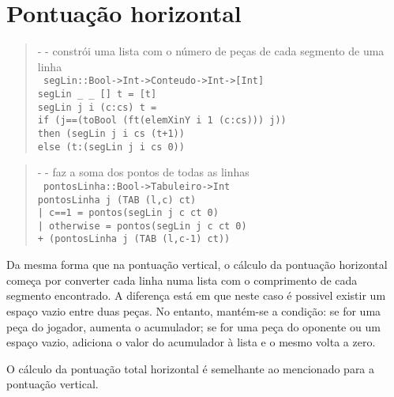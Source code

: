 \documentclass[a4paper,titlepage]{scrreprt}
\begin{document}
	\section{Pontuação horizontal}
		\begin{quote}
			{\small - - constrói uma lista com o número de peças de cada segmento de uma linha\\}
			{\tt
			segLin::Bool->Int->Conteudo->Int->[Int]\\
			segLin \_ \_ [] t = [t]\\
			segLin j i (c:cs) t =\\
			if (j==(toBool (ft(elemXinY i 1 (c:cs))) j))\\
			then (segLin j i cs (t+1))\\
			else (t:(segLin j i cs 0))
			}
		\end{quote}
		\begin{quote}
			{\small - - faz a soma dos pontos de todas as linhas\\}
			{\tt
			pontosLinha::Bool->Tabuleiro->Int\\
			pontosLinha j (TAB (l,c) ct)\\
			| c==1 = pontos(segLin j c ct 0)\\
            | otherwise = pontos(segLin j c ct 0)\\
			+ (pontosLinha j (TAB (l,c-1) ct))
			}
		\end{quote}
	Da mesma forma que na pontuação vertical, o cálculo da pontuação horizontal começa por converter cada linha numa lista com o comprimento
	de cada segmento encontrado. A diferença está em que neste caso é possivel existir um espaço vazio entre duas peças. No entanto, mantém-se
	a condição: se for uma peça do jogador, aumenta o acumulador; se for uma peça do oponente ou um espaço vazio, adiciona o valor do acumulador
	à lista e o mesmo volta a zero.
	
	O cálculo da pontuação total horizontal é semelhante ao mencionado para a pontuação vertical.
\end{document}
